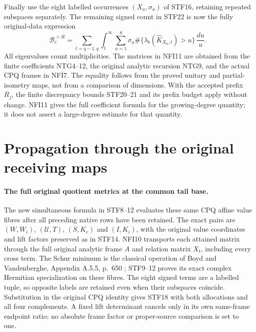 \documentclass[11pt,a4paper]{article}
\begin{document}
Finally use the eight labelled occurrences $(X_a,\sigma_a)$ of
STF16, retaining repeated subspaces separately. The remaining
signed count in STF22 is now the fully original-data expression
\[
 \mathcal B_e^{>R}
  =\sum_{t=q-1,q}\int_1^\infty
       \sum_{a=1}^8\sigma_a
       \#\{\lambda_b(\widehat K_{X_a,t})>u\}
       \,\frac{du}{u}.
                                                               \tag{NFI11}
\]
All eigenvalues count multiplicities. The matrices in NFI11 are
obtained from the finite coefficients NTG4--12, the original
analytic recursion NTG9, and the actual CPQ frames in NFI7.
The equality follows from the proved unitary and partial-isometry
maps, not from a comparison of dimensions. With the accepted prefix
$R_j$, the finite discrepancy bounds STF20--21 and its prefix
budget apply without change. NFI11 gives the full coefficient
formula for the growing-degree quantity; it does not assert a
large-degree estimate for that quantity.
\endgroup

\label{MTBUILD:NATIVE_GRAPH_FLAG_INTERTWINER:end}

\clearpage
\section{Propagation through the original receiving maps}

\label{MTBUILD:CPQ_SIMULTANEOUS_RECEIVER:start}
\paragraph{The full original quotient metrics at the common tail base.}
The new simultaneous formula in STF8--12 evaluates these same CPQ
affine value fibres after all preceding native rows have been retained.
The exact pairs are $(W,W_i)$, $(\mathcal U,T)$, $(S,K_c)$ and
$(I,K_i)$, with the original value coordinates and lift factors
preserved as in STF14. NFI10 transports each attained matrix through
the full original analytic frame $A$ and relation matrix $X_t$,
including every cross term. The Schur minimum is the classical
operation of Boyd and Vandenberghe, Appendix A.5.5, p.~650
\cite{human:boyd-vandenberghe}; STF9--12 proves its exact complex
Hermitian specialization on these fibres. The eight signed terms
are a labelled tuple, so opposite labels are retained even when
their subspaces coincide. Substitution in the original CPQ identity
gives STF18 with both allocations and all four complements. A fixed
lift determinant cancels only in its own same-frame endpoint ratio;
no absolute frame factor or proper-source comparison is set to one.
\end{document}
